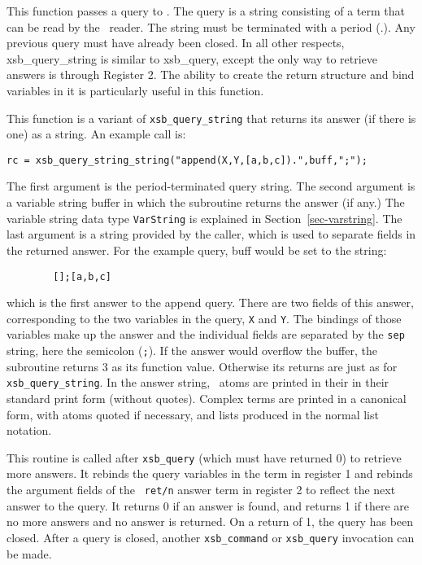 \begin{description}
 
This function passes a query to \ourprolog .  The query is a string
consisting of a term that can be read by the \ourprolog\ reader.  The
string must be terminated with a period (.).  Any previous query must
have already been closed.  In all other respects, xsb\_query\_string
is similar to xsb\_query, except the only way to retrieve answers is
through Register 2.  The ability to create the return structure and
bind variables in it is particularly useful in this function.

  This function
is a variant of {\tt xsb\_query\_string} that returns its answer (if
there is one) as a string.  An example call is:
\begin{verbatim}
rc = xsb_query_string_string("append(X,Y,[a,b,c]).",buff,";");
\end{verbatim}
The first argument is the period-terminated query string.  The second
argument is a variable string buffer in which the subroutine returns the answer
(if any.) The variable string data type {\tt VarString}  is explained in
Section~\ref{sec-varstring}. The last argument is a string
provided by the caller, which is used to separate fields in the returned
answer.  For the example query, buff would be set to the string:
\begin{verbatim}
        [];[a,b,c]
\end{verbatim}
which is the first answer to the append query.  There are two fields of
this answer, corresponding to the two variables in the query, \verb|X|
and \verb|Y|.  The bindings of those variables make up the answer and
the individual fields are separated by the \verb|sep| string, here the
semicolon (\verb|;|).  If the answer would overflow the buffer, the
subroutine returns 3 as its function value.  Otherwise its returns are
just as for {\tt xsb\_query\_string}.  In the answer string, \ourprolog\
atoms are printed in their in their standard print form (without
quotes).  Complex terms are printed in a canonical form, with atoms
quoted if necessary, and lists produced in the normal list notation.

 
This routine is called after {\tt xsb\_query} (which must have
returned 0) to retrieve more answers.  It rebinds the query variables
in the term in register 1 and rebinds the argument fields of the {\tt
ret/n} answer term in register 2 to reflect the next answer to the
query.  It returns 0 if an answer is found, and returns 1 if there are
no more answers and no answer is returned. On a return of 1, the query
has been closed.  After a query is closed, another {\tt xsb\_command}
or {\tt xsb\_query} invocation can be made.


\end{description}
